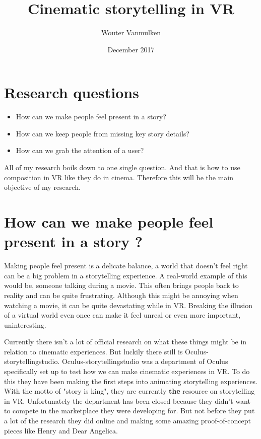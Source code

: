 \documentclass{report}
\title{Cinematic storytelling in VR}
\author{Wouter Vanmulken}
\date{December 2017}
\begin{document}
				\maketitle
				\tableofcontents
				\newpage
		
				
				\chapter{Research questions}
		
				\begin{itemize}
					\item How can we make people feel present in a story?
					\item How can we keep people from missing key story details?
					\item How can we grab the attention of a user?
				\end{itemize}
				\begin{par}
					All of my research boils down to one single question. And that is how to use composition in VR like they do in cinema. Therefore this will be the main objective of my research.
				\end{par}

			

				\chapter{How can we make people feel present in a story ?}
								
				Making people feel present is a delicate balance, a world that doesn't feel right can be a big problem in a storytelling experience. A real-world example of this would be, someone talking during a movie. This often brings people back to reality and can be quite frustrating. Although this might be annoying when watching a movie, it can be quite devastating while in VR. Breaking the illusion of a virtual world even once can make it feel unreal or even more important, uninteresting.

				Currently there isn't a lot of official research on what these things might be in relation to cinematic experiences. But luckily there still is Oculus-storytellingstudio. Oculus-storytellingstudio was a department of Oculus specifically set up to test how we can make cinematic experiences in VR. To do this they have been making the first steps into animating storytelling experiences. With the motto of "story is king", they are currently \textbf{the} resource on storytelling in VR. Unfortunately the department has been closed because they didn't want to compete in the marketplace they were developing for. But not before they put a lot of the research they did online and making some amazing proof-of-concept pieces like Henry and Dear Angelica.
				
\end{document}
